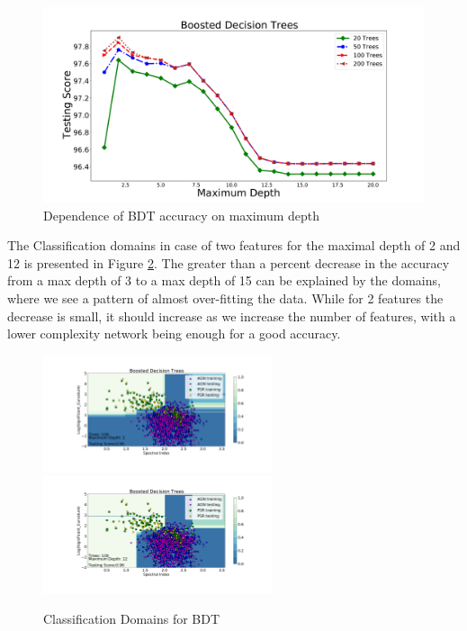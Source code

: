 \begin{figure}[h]
\includegraphics[width=\twopicsp\textwidth]{plots/bdt_train.pdf}
\caption{Dependence of BDT accuracy on maximum depth}
\label{fig:BDT_depth}
\end{figure}

The Classification domains in case of two features for the maximal depth of 2 and 12 is presented in Figure \ref{fig:BDT_domains}. The greater than a percent decrease in the accuracy from a max depth of 3 to a max depth of 15 can be explained by the domains, where we see a pattern of almost over-fitting the data. While for 2 features the decrease is small, it should increase as we increase the number of features, with a lower complexity network being enough for a good accuracy.

\begin{figure}[h]
\hspace*{-1.5cm}
\includegraphics[width=0.6\textwidth]{plots/bdt_100_2.pdf}
\hspace*{-1.5cm}
\includegraphics[width=0.6\textwidth]{plots/bdt_100_12.pdf}
\caption{Classification Domains for BDT}
\label{fig:BDT_domains}
\end{figure}


